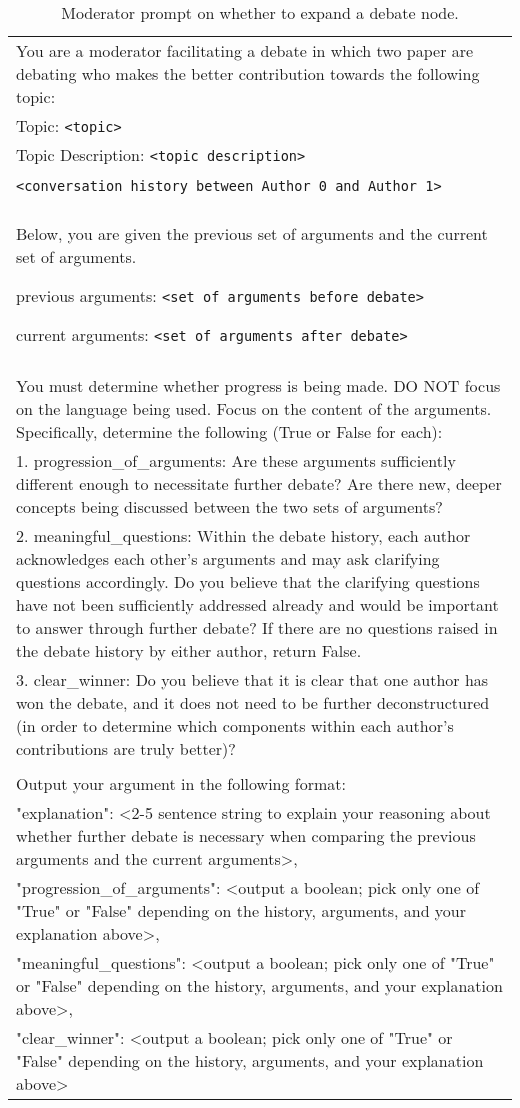 \begin{table*}[h]
\centering
\begin{tabularx}{\textwidth}{|X|}
\hline
You are a moderator facilitating a debate in which two paper are debating who makes the better contribution towards the following topic:\\
Topic: \texttt{<topic>} \\
Topic Description: \texttt{<topic description>}
\\\\
\texttt{<conversation history between Author 0 and Author 1>}
\\\\
Below, you are given the previous set of arguments and the current set of arguments. 

previous arguments: \texttt{<set of arguments before debate>}

current arguments: \texttt{<set of arguments after debate>}
\\\\
You must determine whether progress is being made. DO NOT focus on the language being used. Focus on the content of the arguments. Specifically, determine the following (True or False for each): \\
1. progression\_of\_arguments: Are these arguments sufficiently different enough to necessitate further debate? Are there new, deeper concepts being discussed between the two sets of arguments? \\
2. meaningful\_questions: Within the debate history, each author acknowledges each other's arguments and may ask clarifying questions accordingly. Do you believe that the clarifying questions have not been sufficiently addressed already and would be important to answer through further debate? If there are no questions raised in the debate history by either author, return False. \\
3. clear\_winner: Do you believe that it is clear that one author has won the debate, and it does not need to be further deconstructured (in order to determine which components within each author's contributions are truly better)?
\\\\
Output your argument in the following format: \\
    "explanation": <2-5 sentence string to explain your reasoning about whether further debate is necessary when comparing the previous arguments and the current arguments>,\\
    "progression\_of\_arguments": <output a boolean; pick only one of "True" or "False" depending on the history, arguments, and your explanation above>, \\
    "meaningful\_questions": <output a boolean; pick only one of "True" or "False" depending on the history, arguments, and your explanation above>, \\
    "clear\_winner": <output a boolean; pick only one of "True" or "False" depending on the history, arguments, and your explanation above>
 \\ \hline
\end{tabularx}
\caption{Moderator prompt on whether to expand a debate node.}
\label{prompt_mod: is_expand}
\end{table*}

